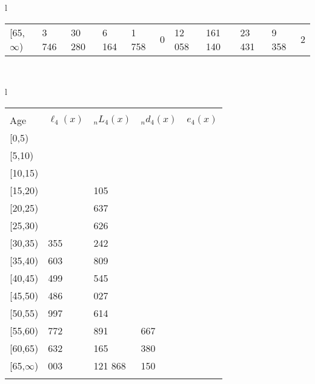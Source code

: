 \documentclass[
]{article}
\begin{document}
\begin{table}
\begin{tabular}[t]{l}
\begin{tabular}
{}[65,$\infty$) & 3 746 & 30 280 & 6 164 & 1 758 & 0 & 12 058 & 161 140 & 23 431 & 9 358 & 2\\
\end{tabular}\\
\end{tabular}
\centering
\begin{tabular}[t]{l}
\hline
\begin{tabular}{>{\raggedright\arraybackslash}p{.43in}>{\raggedleft\arraybackslash}p{1.3in}>{\raggedleft\arraybackslash}p{1.3in}>{\raggedleft\arraybackslash}p{1.3in}>{\raggedleft\arraybackslash}p{1.3in}}
\toprule
\multicolumn{1}{c}{ } & \multicolumn{4}{c}{(4) Lost both} \\
\cmidrule(l{3pt}r{3pt}){2-5}
Age & $\ell_{4}(x)$ & ${}_nL_{4}(x)$ & ${}_nd_{4}(x)$ & $e_{4}(x)$\\
\midrule
{}[0,5) & 0 & 123 & 0 & 18\\
{}[5,10) & 42 & 306 & 0 & 18\\
{}[10,15) & 80 & 526 & 0 & 18\\
{}[15,20) & 156 & 1 105 & 1 & 18\\
{}[20,25) & 332 & 2 637 & 3 & 18\\
\addlinespace
{}[25,30) & 788 & 5 626 & 10 & 18\\
{}[30,35) & 1 355 & 10 242 & 25 & 18\\
{}[35,40) & 2 603 & 18 809 & 55 & 18\\
{}[40,45) & 4 499 & 35 545 & 125 & 18\\
{}[45,50) & 8 486 & 64 027 & 296 & 18\\
\addlinespace
{}[50,55) & 14 997 & 109 614 & 737 & 18\\
{}[55,60) & 24 772 & 163 891 & 1 667 & 17\\
{}[60,65) & 36 632 & 228 165 & 3 380 & 16\\
{}[65,$\infty$) & 49 003 & 1 121 868 & 65 150 & 14\\
\bottomrule
\multicolumn{5}{l}{\rule{0pt}{1em}\textsuperscript{*} Based on an estimated from SIPP with less than 10 respondents in the numerator.}\\
\end{tabular}\\
\end{tabular}
\end{table}
\end{document}

